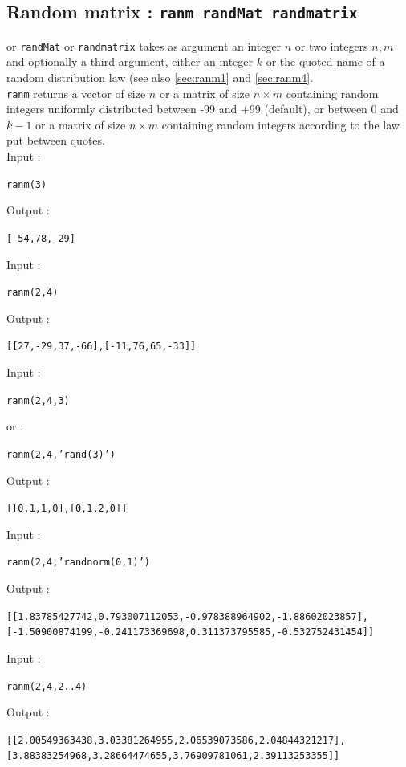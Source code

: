 \documentclass[a4paper,11pt]{book}
\begin{document}
\subsection{Random matrix : {\tt ranm randMat randmatrix}}\label{sec:ranm2}
 or {\tt randMat} or {\tt randmatrix} takes as argument an 
integer $n$ or two integers $n,m$ and optionally a third argument, either an 
integer $k$ or the quoted name of a random distribution law
(see also \ref{sec:ranm1} and  \ref{sec:ranm4}.\\ %
{\tt ranm} returns a vector of size $n$ or a matrix of size $n\times m$
 containing random integers uniformly distributed between -99 and +99 
(default), or between 0 and $k-1$ or  a matrix  of size $n\times m$
containing random integers according to the law put between quotes.\\
Input :
\begin{center}{\tt ranm(3)}\end{center}
Output :
\begin{center}{\tt [-54,78,-29]}\end{center}
Input :
\begin{center}{\tt ranm(2,4)}\end{center}
Output :
\begin{center}{\tt [[27,-29,37,-66],[-11,76,65,-33]]}\end{center}
Input :
\begin{center}{\tt ranm(2,4,3)}\end{center}
or :
\begin{center}{\tt ranm(2,4,'rand(3)')}\end{center}
Output :
\begin{center}{\tt [[0,1,1,0],[0,1,2,0]]}\end{center}
Input :
\begin{center}{\tt ranm(2,4,'randnorm(0,1)')}\end{center}
Output :
\begin{center}{\tt [[1.83785427742,0.793007112053,-0.978388964902,-1.88602023857], [-1.50900874199,-0.241173369698,0.311373795585,-0.532752431454]]}\end{center}
Input :
\begin{center}{\tt ranm(2,4,2..4)}\end{center}
Output :
\begin{center}{\tt [[2.00549363438,3.03381264955,2.06539073586,2.04844321217],
 [3.88383254968,3.28664474655,3.76909781061,2.39113253355]]}\end{center}
\end{document}
